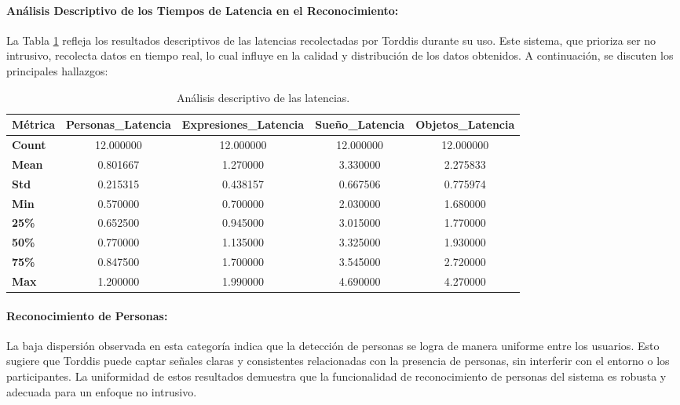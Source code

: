 \documentclass[a4paper,fleqn]{cas-sc}
\begin{document}
					\paragraph{Análisis Descriptivo de los Tiempos de Latencia en el Reconocimiento:} La Tabla \ref{tab:descriptive-analysis} refleja los resultados descriptivos de las latencias recolectadas por Torddis durante su uso. Este sistema, que prioriza ser no intrusivo, recolecta datos en tiempo real, lo cual influye en la calidad y distribución de los datos obtenidos. A continuación, se discuten los principales hallazgos:
					
					\begin{table}[hbt!]
						\centering
						\caption{Análisis descriptivo de las latencias.}
						\label{tab:descriptive-analysis}
						\begin{tabularx}{\textwidth}{lcccc}
							\toprule
							\textbf{Métrica} & \textbf{Personas\_Latencia} & \textbf{Expresiones\_Latencia} & \textbf{Sueño\_Latencia} & \textbf{Objetos\_Latencia} \\
							\midrule
							\textbf{Count}   & 12.000000 & 12.000000 & 12.000000 & 12.000000 \\
							\textbf{Mean}    & 0.801667  & 1.270000  & 3.330000  & 2.275833  \\
							\textbf{Std}     & 0.215315  & 0.438157  & 0.667506  & 0.775974  \\
							\textbf{Min}     & 0.570000  & 0.700000  & 2.030000  & 1.680000  \\
							\textbf{25\%}    & 0.652500  & 0.945000  & 3.015000  & 1.770000  \\
							\textbf{50\%}    & 0.770000  & 1.135000  & 3.325000  & 1.930000  \\
							\textbf{75\%}    & 0.847500  & 1.700000  & 3.545000  & 2.720000  \\
							\textbf{Max}     & 1.200000  & 1.990000  & 4.690000  & 4.270000  \\
							\bottomrule
						\end{tabularx}
					\end{table}
					
					\paragraph{Reconocimiento de Personas:}
						La baja dispersión observada en esta categoría indica que la detección de personas se logra de manera uniforme entre los usuarios. Esto sugiere que Torddis puede captar señales claras y consistentes relacionadas con la presencia de personas, sin interferir con el entorno o los participantes. La uniformidad de estos resultados demuestra que la funcionalidad de reconocimiento de personas del sistema es robusta y adecuada para un enfoque no intrusivo.
					
\end{document}
